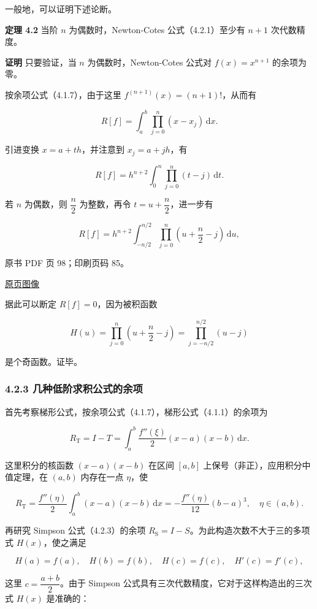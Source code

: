 一般地，可以证明下述论断。

\textbf{定理 4.2} 当阶 \(n\) 为偶数时，Newton-Cotes 公式（4.2.1）至少有 \(n+1\) 次代数精度。

\textbf{证明} 只要验证，当 \(n\) 为偶数时，Newton-Cotes 公式对 \(f(x)=x^{n+1}\) 的余项为零。

按余项公式（4.1.7），由于这里 \(f^{(n+1)}(x)=(n+1)!\)，从而有

\[
R[f]=\int_a^b\prod_{j=0}^n(x-x_j)\,\mathrm{d}x.
\]

引进变换 \(x=a+th\)，并注意到 \(x_j=a+jh\)，有

\[
R[f]=h^{n+2}\int_0^n\prod_{j=0}^n(t-j)\,\mathrm{d}t.
\]

若 \(n\) 为偶数，则 \(\dfrac n2\) 为整数，再令 \(t=u+\dfrac n2\)，进一步有

\[
R[f]=h^{n+2}\int_{-n/2}^{n/2}\prod_{j=0}^n\left(u+\frac n2-j\right)\,\mathrm{d}u,
\]

\clearpage

原书 PDF 页 98；印刷页码 85。

\href{source-images/pdf-098.jpeg}{原页图像}

据此可以断定 \(R[f]=0\)，因为被积函数

\[
H(u)=\prod_{j=0}^n\left(u+\frac n2-j\right)=\prod_{j=-n/2}^{n/2}(u-j)
\]

是个奇函数。证毕。

\subsubsection{4.2.3 几种低阶求积公式的余项}\label{ch04a-ux51e0ux79cdux4f4eux9636ux6c42ux79efux516cux5f0fux7684ux4f59ux9879}

首先考察梯形公式，按余项公式（4.1.7），梯形公式（4.1.1）的余项为

\[
R_{\mathrm{T}}=I-T=\int_a^b\frac{f''(\xi)}2(x-a)(x-b)\,\mathrm{d}x.
\]

这里积分的核函数 \((x-a)(x-b)\) 在区间 \([a,b]\) 上保号（非正），应用积分中值定理，在 \((a,b)\) 内存在一点 \(\eta\)，使

\[
R_{\mathrm{T}}=\frac{f''(\eta)}2\int_a^b(x-a)(x-b)\,\mathrm{d}x
=-\frac{f''(\eta)}{12}(b-a)^3,\quad\eta\in(a,b).
\tag{4.2.5}
\]

再研究 Simpson 公式（4.2.3）的余项 \(R_{\mathrm{S}}=I-S\)。为此构造次数不大于三的多项式 \(H(x)\)，使之满足

\[
H(a)=f(a),\quad H(b)=f(b),\quad H(c)=f(c),\quad H'(c)=f'(c),
\tag{4.2.6}
\]

这里 \(c=\dfrac{a+b}{2}\)。由于 Simpson 公式具有三次代数精度，它对于这样构造出的三次式 \(H(x)\) 是准确的：

